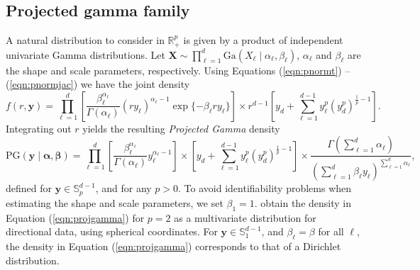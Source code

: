 \subsection{Projected gamma family\label{subsec:projgamma}}
  A natural  distribution to consider in ${\mathbb R}^p_+$ is given by a product of independent
  univariate Gamma distributions. Let
    $\bm{ X} \sim \prod_{\ell = 1}^d\text{Ga}\left(X_{\ell}\mid\alpha_{\ell},\beta_{\ell}\right)$, 
    $\alpha_\ell$ and $\beta_\ell$ are the shape and scale parameters, respectively. Using Equations (\ref{eqn:pnormt}) -- (\ref{eqn:pnormjac}) we have the joint density
  \begin{equation}
  \label{joint}
    f(r,\bm{ y}) = \prod_{\ell = 1}^{d}
      \left[\frac{\beta_{\ell}^{\alpha_{\ell}}}{\Gamma(\alpha_{\ell})}(ry_{\ell})^{\alpha_{\ell} - 1}
          \exp\lbrace-\beta_{\ell}ry_{\ell}\rbrace\right]
      \times r^{d-1}\left[y_d +
            {\textstyle \sum}_{\ell = 1}^{d-1}y_{\ell}^p\left(y_d^p\right)^{\frac{1}{p} - 1}\right].
  \end{equation}
  Integrating out $r$ yields the resulting \emph{Projected Gamma} density
  \begin{equation}
    \label{eqn:projgamma}
    \text{PG}(\bm{ y}\mid\bm{ \alpha},\bm{ \beta}) =
          \prod_{\ell = 1}^d\left[\frac{\beta_{\ell}^{\alpha_{\ell}}}{\Gamma(\alpha_{\ell})}
                y_{\ell}^{\alpha_{\ell} - 1}\right]
      \times \left[y_d +
          {\textstyle \sum}_{\ell = 1}^{d-1}y_{\ell}^p\left(y_d^p\right)^{\frac{1}{p} - 1}\right]
      \times \frac{\Gamma({\textstyle\sum}_{\ell = 1}^d\alpha_{\ell})}{\left({\textstyle\sum}_{\ell = 1}^d
                    \beta_{\ell}y_{\ell}\right)^{{\scriptstyle\sum_{\ell = 1}^d \alpha_{\ell}}}} ,
  \end{equation}
  defined for $\bm{y}\in {\mathbb S}_p^{d-1}$, and for any $p>0$. To avoid identifiability problems when estimating the shape and scale parameters, we set $\beta_1 = 1$.
  \cite{nunez2019} obtain the density in Equation (\ref{eqn:projgamma})
  for $p=2$ as a multivariate distribution for directional data, using spherical coordinates.
  For $\bm{ y}\in {\mathbb S}_1^{d-1}$, and $\beta_{\ell} = \beta$ for all $\ell$, the density in Equation (\ref{eqn:projgamma}) corresponds to that of a Dirichlet distribution.
  

